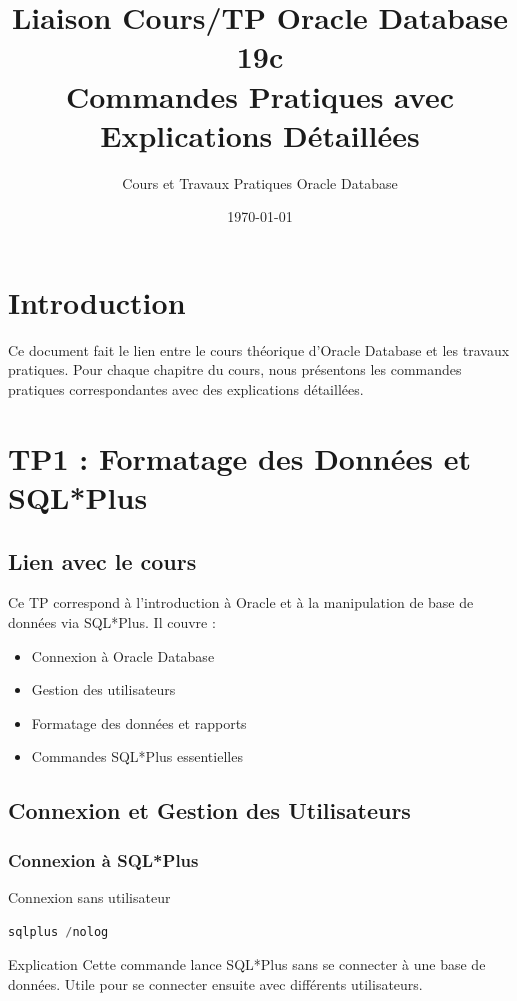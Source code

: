 \documentclass[12pt,a4paper]{article}
\title{\textbf{Liaison Cours/TP Oracle Database 19c}\\
Commandes Pratiques avec Explications Détaillées}
\author{Cours et Travaux Pratiques Oracle Database}
\date{\today}
\begin{document}
\maketitle
\tableofcontents
\newpage

\section{Introduction}

Ce document fait le lien entre le cours théorique d'Oracle Database et les travaux pratiques. Pour chaque chapitre du cours, nous présentons les commandes pratiques correspondantes avec des explications détaillées.

\section{TP1 : Formatage des Données et SQL*Plus}

\subsection{Lien avec le cours}

Ce TP correspond à l'introduction à Oracle et à la manipulation de base de données via SQL*Plus. Il couvre :
\begin{itemize}
    \item Connexion à Oracle Database
    \item Gestion des utilisateurs
    \item Formatage des données et rapports
    \item Commandes SQL*Plus essentielles
\end{itemize}

\subsection{Connexion et Gestion des Utilisateurs}

\subsubsection{Connexion à SQL*Plus}

\begin{commande}{Connexion sans utilisateur}
\begin{lstlisting}[language=SQL]
sqlplus /nolog
\end{lstlisting}
\end{commande}

\begin{explication}{Explication}
Cette commande lance SQL*Plus sans se connecter à une base de données. Utile pour se connecter ensuite avec différents utilisateurs.
\end{explication}
\end{document}
